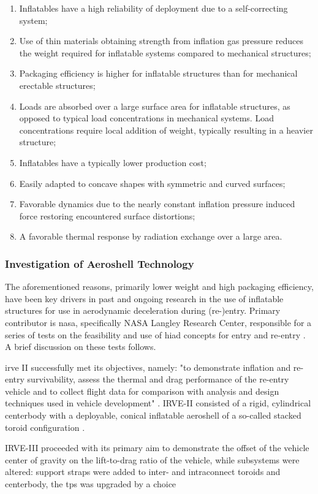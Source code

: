 \begin{enumerate}
\item Inflatables have a high reliability of deployment due to a self-correcting system;
\item Use of thin materials obtaining strength from inflation gas pressure reduces the weight required for inflatable systems compared to mechanical structures;
\item Packaging efficiency is higher for inflatable structures than for mechanical erectable structures;
\item Loads are absorbed over a large surface area for inflatable structures, as opposed to typical load concentrations in mechanical systems. Load concentrations require local addition of weight, typically resulting in a heavier structure;
\item Inflatables have a typically lower production cost;
\item Easily adapted to concave shapes with symmetric and curved surfaces;
\item Favorable dynamics due to the nearly constant inflation pressure induced force restoring encountered surface distortions;
\item A favorable thermal response by radiation exchange over a large area.
\end{enumerate}

\subsubsection{Investigation of Aeroshell Technology}
The aforementioned reasons, primarily lower weight and high packaging efficiency, have been key drivers in past and ongoing research in the use of inflatable structures for use in aerodynamic deceleration during (re-)entry. Primary contributor is \gls{nasa}, specifically NASA Langley Research Center, responsible for a series of tests on the feasibility and use of \gls{hiad} concepts for entry and re-entry \cite{irve1, irve2, irve3, thor}. A brief discussion on these tests follows.

\gls{irve} II successfully met its objectives, namely: "to demonstrate inflation and re-entry survivability, assess the thermal and drag performance of the re-entry vehicle and to collect flight data for comparison with analysis and design techniques used in vehicle development" \cite[p.1]{flightperfirve2}. IRVE-II consisted of a rigid, cylindrical centerbody with a deployable, conical inflatable aeroshell of a so-called stacked toroid configuration \cite{histoverviewtech,vehicleflexibilityirve2}.

IRVE-III proceeded with its primary aim to demonstrate the offset of the vehicle center of gravity on the lift-to-drag ratio of the vehicle, while subsystems were altered: support straps were added to inter- and intraconnect toroids and centerbody, the \gls{tps} was upgraded by a choice
